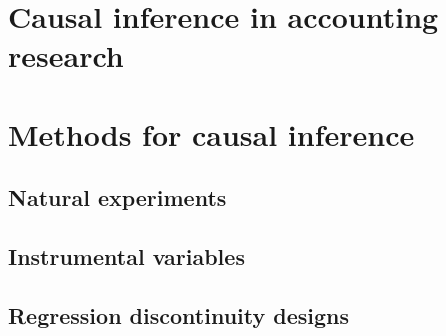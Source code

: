 \section{Causal inference in accounting research}


\section{Methods for causal inference}

\subsection{Natural experiments}

\subsection{Instrumental variables}

\subsection{Regression discontinuity designs}